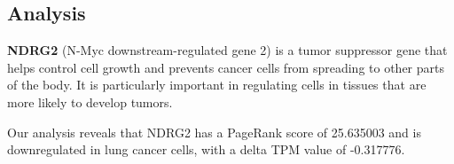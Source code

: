 \subsection{Analysis} \label{subsec:analysis}





\textbf{NDRG2} (N-Myc downstream-regulated gene 2) is a tumor suppressor gene that helps control cell growth and
prevents cancer cells from spreading to other parts of the body.
It is particularly important in regulating cells in tissues that are more likely to develop tumors. \cite{Lee2022NDRG2}

Our analysis reveals that NDRG2 has a PageRank score of 25.635003 and is downregulated in lung cancer cells,
with a delta TPM value of -0.317776.


